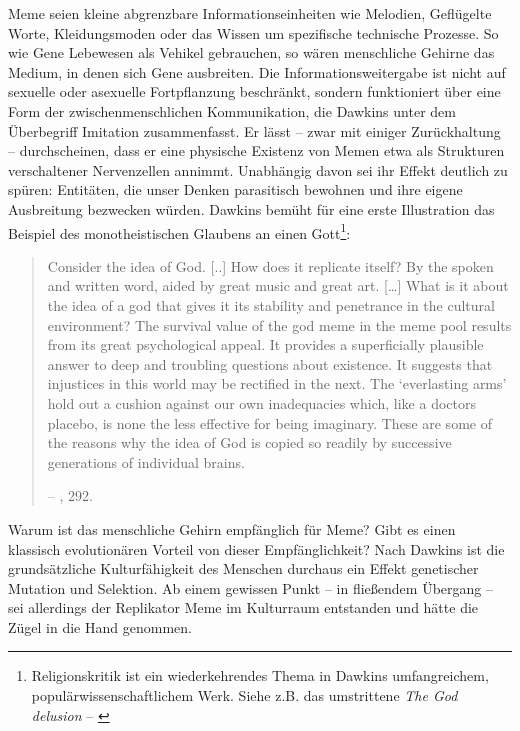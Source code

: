 \documentclass[openany,twoside,twocolumn]{book}
\let\rmarkdownfootnote\footnote%
\def\footnote{\protect\rmarkdownfootnote}
\begin{document}
Meme seien kleine abgrenzbare Informationseinheiten wie Melodien,
Geflügelte Worte, Kleidungsmoden oder das Wissen um spezifische
technische Prozesse. So wie Gene Lebewesen als Vehikel gebrauchen, so
wären menschliche Gehirne das Medium, in denen sich Gene ausbreiten. Die
Informationsweitergabe ist nicht auf sexuelle oder asexuelle
Fortpflanzung beschränkt, sondern funktioniert über eine Form der
zwischenmenschlichen Kommunikation, die Dawkins unter dem Überbegriff
Imitation zusammenfasst. Er lässt -- zwar mit einiger Zurückhaltung --
durchscheinen, dass er eine physische Existenz von Memen etwa als
Strukturen verschaltener Nervenzellen annimmt. Unabhängig davon sei ihr
Effekt deutlich zu spüren: Entitäten, die unser Denken parasitisch
bewohnen und ihre eigene Ausbreitung bezwecken würden. Dawkins bemüht
für eine erste Illustration das Beispiel des monotheistischen Glaubens
an einen Gott\footnote{Religionskritik ist ein wiederkehrendes Thema in
  Dawkins umfangreichem, populärwissenschaftlichem Werk. Siehe z.B. das
  umstrittene \emph{The God delusion} -- \textcite{dawkins_god_2006}}:

\begin{quote}
Consider the idea of God. {[}..{]} How does it replicate itself? By the
spoken and written word, aided by great music and great art.
{[}\ldots{}{]} What is it about the idea of a god that gives it its
stability and penetrance in the cultural environment? The survival value
of the god meme in the meme pool results from its great psychological
appeal. It provides a superficially plausible answer to deep and
troubling questions about existence. It suggests that injustices in this
world may be rectified in the next. The `everlasting arms' hold out a
cushion against our own inadequacies which, like a doctors placebo, is
none the less effective for being imaginary. These are some of the
reasons why the idea of God is copied so readily by successive
generations of individual brains.

-- \textcite{Dawkinsselfishgene40th2016}, 292.
\end{quote}

Warum ist das menschliche Gehirn empfänglich für Meme? Gibt es einen
klassisch evolutionären Vorteil von dieser Empfänglichkeit? Nach Dawkins
ist die grundsätzliche Kulturfähigkeit des Menschen durchaus ein Effekt
genetischer Mutation und Selektion. Ab einem gewissen Punkt -- in
fließendem Übergang -- sei allerdings der Replikator Meme im Kulturraum
entstanden und hätte die Zügel in die Hand genommen.
\end{document}
